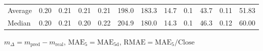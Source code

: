 \begin{threeparttable}
{\begin{tabular}{lrrrrrrrrrrr}
Average &          0.20 &          0.21 &          0.21 &        0.21 &               198.0 &               183.3 &       14.7 &                 0.1 &             43.7 &            0.11 &                  51.83 \\
 Median &          0.20 &          0.21 &          0.20 &        0.22 &               204.9 &               180.0 &       14.3 &                 0.1 &             46.3 &            0.12 &                  60.00 \\
\bottomrule
\end{tabular}
}
\begin{tablenotes}\footnotesize
\item $m_\Delta=m_{\text{pred}}-m_{\text{real}}$,
$\mathrm{MAE}_5=\mathrm{MAE}_{5\text{d}}$,
$\mathrm{RMAE}=\mathrm{MAE}_5/\text{Close}$
\end{tablenotes}
\end{threeparttable}
\endgroup

